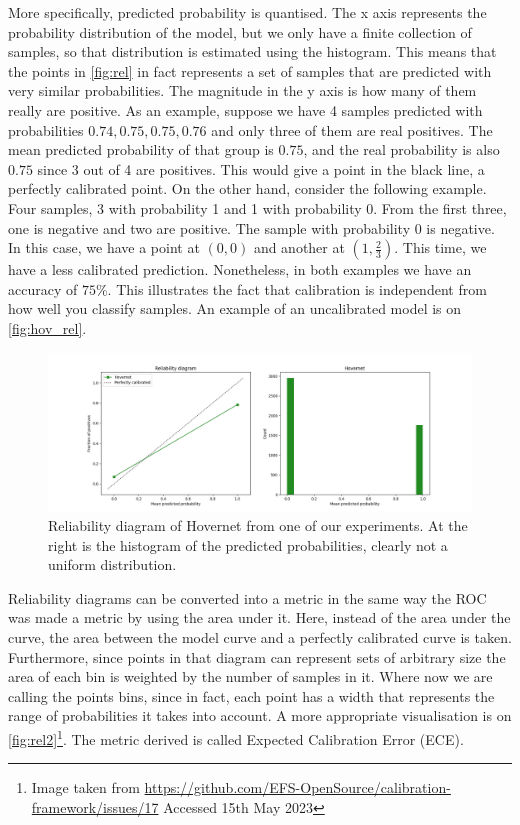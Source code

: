 More specifically, predicted probability is quantised. The x axis represents the probability distribution of the model, but we only have a finite collection of samples, so that distribution is estimated using the histogram. This means that the points in \autoref{fig:rel} in fact represents a set of samples that are predicted with very similar probabilities. The magnitude in the y axis is how many of them really are positive. As an example, suppose we have 4 samples predicted with probabilities $0.74, 0.75, 0.75, 0.76$ and only three of them are real positives. The mean predicted probability of that group is $0.75$, and the real probability is also $0.75$ since 3 out of 4 are positives. This would give a point in the black line, a perfectly calibrated point. On the other hand, consider the following example. Four samples, 3 with probability 1 and 1 with probability 0. From the first three, one is negative and two are positive. The sample with probability 0 is negative. In this case, we have a point at $(0,0)$ and another at $(1,\frac{2}{3})$. This time, we have a less calibrated prediction. Nonetheless, in both examples we have an accuracy of $75\%$. This illustrates the fact that calibration is independent from how well you classify samples. An example of an uncalibrated model is on \autoref{fig:hov_rel}.

\begin{figure}[ht]
    \centering
    \includegraphics[width=\textwidth]{imgs/hov_rel_diag.png}
    \caption{Reliability diagram of Hovernet from one of our experiments. At the right is the histogram of the predicted probabilities, clearly not a uniform distribution.}
    \label{fig:hov_rel}
\end{figure}

Reliability diagrams can be converted into a metric in the same way the ROC was made a metric by using the area under it. Here, instead of the area under the curve, the area between the model curve and a perfectly calibrated curve is taken. Furthermore, since points in that diagram can represent sets of arbitrary size the area of each bin is weighted by the number of samples in it. Where now we are calling the points bins, since in fact, each point has a width that represents the range of probabilities it takes into account. A more appropriate visualisation is on \autoref{fig:rel2}\footnote{Image taken from \url{https://github.com/EFS-OpenSource/calibration-framework/issues/17} Accessed 15th May 2023}. The metric derived is called Expected Calibration Error (ECE).


